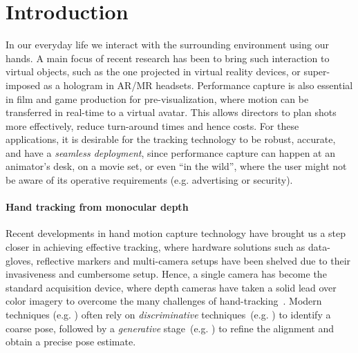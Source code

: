 \section{Introduction}
In our everyday life we interact with the surrounding environment using our hands. A main focus of recent research has been to bring such interaction to virtual objects, such as the one projected in virtual reality devices, %
or super-imposed as a hologram in AR/MR headsets. 
Performance capture is also essential in film and game production for pre-visualization, where motion can be transferred in real-time to a virtual avatar. This allows directors to plan shots more effectively, reduce turn-around times and hence costs.
For these applications, it is desirable for the tracking technology to be robust, accurate, and have a \emph{seamless deployment}, since performance capture can happen at an animator's desk, on a movie set, or even ``in the wild'',  where the user might not be aware of its operative requirements (e.g. advertising or security).

\paragraph{Hand tracking from monocular depth}
Recent developments in hand motion capture technology have brought us a step closer in achieving effective tracking, where hardware solutions such as data-gloves, reflective markers and multi-camera setups have been shelved due to their invasiveness and cumbersome setup.
Hence, a single camera has become the standard acquisition device, where depth cameras  have taken a solid lead over color imagery to overcome the many challenges of hand-tracking~\cite{supancic2015depth}. 
Modern techniques (e.g. ) often rely on \emph{discriminative} techniques~(e.g. ) to identify a coarse pose, followed by a \emph{generative} stage~(e.g. ) to refine the alignment and obtain a precise pose estimate.


